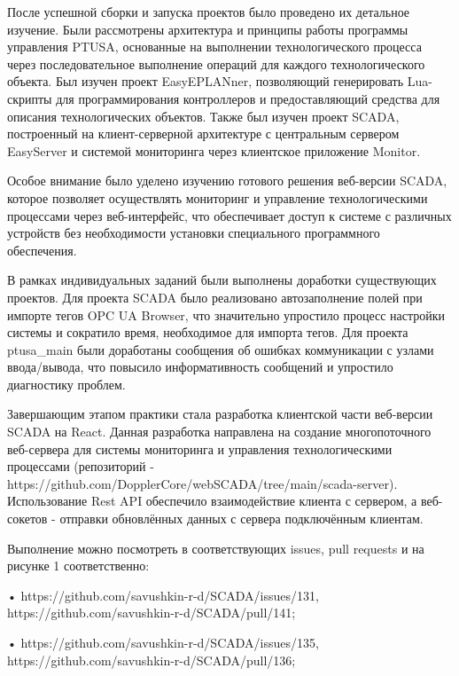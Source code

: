 {\par \redline После успешной сборки и запуска проектов было проведено их детальное изучение. Были рассмотрены архитектура и принципы работы программы управления PTUSA, основанные на выполнении технологического процесса через последовательное выполнение операций для каждого технологического объекта. Был изучен проект EasyEPLANner, позволяющий генерировать Lua-скрипты для программирования контроллеров и предоставляющий средства для описания технологических объектов. Также был изучен проект SCADA, построенный на клиент-серверной архитектуре с центральным сервером EasySer\-ver и системой мониторинга через клиентское приложение Monitor.

\par \redline Особое внимание было уделено изучению готового решения веб-версии SCADA, которое позволяет осуществлять мониторинг и управление технологическими процессами через веб-интерфейс, что обеспечивает доступ к системе с различных устройств без необходимости установки специального программного обеспечения.

\par \redline В рамках индивидуальных заданий были выполнены доработки существующих проектов. Для проекта SCADA было реализовано автозаполнение полей при импорте тегов OPC UA Browser, что значительно упростило процесс настройки системы и сократило время, необходимое для импорта тегов. Для проекта ptusa\_main были доработаны сообщения об ошибках коммуникации с узлами ввода/вывода, что повысило информативность сообщений и упростило диагностику проблем.

\par \redline Завершающим этапом практики стала разработка клиентской части веб-версии SCA\-DA на React. Данная разработка направлена на создание многопоточного веб-сервера для системы мониторинга и управления технологическими процессами (репозиторий - https://gi\-thub.com/DopplerCore/webSCADA/tree/main/scada-server). Использование Rest API обеспечило взаимодействие клиента с сервером, а веб-сокетов - отправки обновлённых данных с сервера подключённым клиентам.

\par \redline Выполнение можно посмотреть в соответствующих issues, pull requests и на рисунке 1 соответственно:
 
  \par \redline • https://github.com/savushkin-r-d/SCADA/issues/131, https://github.com/savushkin-r-d/SCADA/pull/141;
 
  \par \redline • https://github.com/savushkin-r-d/SCADA/issues/135, https://github.com/savushkin-r-d/SCADA/pull/136;
 
}
